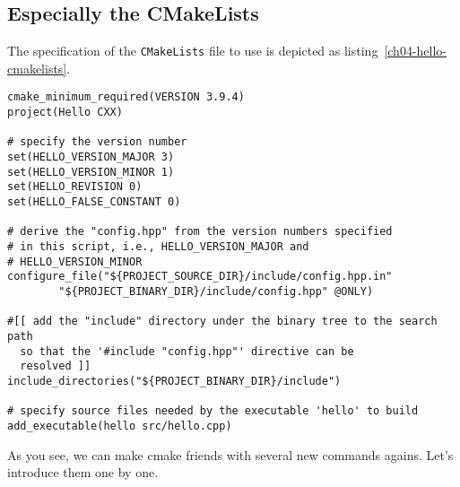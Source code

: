 \subsection{Especially the CMakeLists}
The specification of the \texttt{CMakeLists} file to use is depicted as listing~\ref{ch04-hello-cmakelists}.\par
\begin{lstlisting}[caption=\texttt{CMakeLists.txt},label=ch04-hello-cmakelists]
cmake_minimum_required(VERSION 3.9.4)
project(Hello CXX)

# specify the version number
set(HELLO_VERSION_MAJOR 3)
set(HELLO_VERSION_MINOR 1)
set(HELLO_REVISION 0)
set(HELLO_FALSE_CONSTANT 0)

# derive the "config.hpp" from the version numbers specified
# in this script, i.e., HELLO_VERSION_MAJOR and
# HELLO_VERSION_MINOR
configure_file("${PROJECT_SOURCE_DIR}/include/config.hpp.in"
        "${PROJECT_BINARY_DIR}/include/config.hpp" @ONLY)

#[[ add the "include" directory under the binary tree to the search path
  so that the '#include "config.hpp"' directive can be
  resolved ]]
include_directories("${PROJECT_BINARY_DIR}/include")

# specify source files needed by the executable 'hello' to build
add_executable(hello src/hello.cpp)
\end{lstlisting}
As you see, we can make cmake friends with several new commands agains. Let's introduce them one by one.
